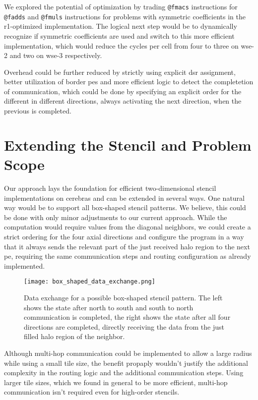 We explored the potential of optimization by trading \texttt{@fmacs} instructions for \texttt{@fadds} and \texttt{@fmuls} instructions for problems with symmetric coefficients in the r1-optimized implementation. The logical next step would be to dynamically recognize if symmetric coefficients are used and switch to  this more efficient implementation, which would reduce the cycles per cell from four to three on \ac{wse}-2 and two on \ac{wse}-3 respectively.

Overhead could be further reduced by strictly using explicit \ac{dsr} assignment, better utilization of border \acp{pe} and more efficient logic to detect the completetion of communication, which could be done by specifying an explicit order for the different in different directions, always activating the next direction, when the previous is completed.

\section{Extending the Stencil and Problem Scope}
Our approach lays the foundation for efficient two-dimensional stencil implementations on cerebras and can be extended in several ways.
One natural way would be to support all box-shaped stencil patterns.
We believe, this could be done with only minor adjustments to our current approach.
While the computation would require values from the diagonal neighbors, we could create a strict ordering for the four axial directions and configure the program in a way that it always sends the relevant part of the just received halo region to the next \ac{pe}, requiring the same communication steps and routing configuration as already implemented.

\begin{figure}[H]
    \centering
    \texttt{[image: box\_shaped\_data\_exchange.png]}
    \caption{Data exchange for a possible box-shaped stencil pattern. The left shows the state after north to south and south to north communication is completed, the right shows the state after all four directions are completed, directly receiving the data from the just filled halo region of the neighbor.}
    \label{fig:data_exchange_box_shaped}
\end{figure}

Although multi-hop communication could be implemented to allow a large radius while using a small tile size, the benefit propaply wouldn't justify the additional complexity in the routing logic and the additional communication steps. Using larger tile sizes, which we found in general to be more efficient, multi-hop communication isn't required even for high-order stencils.


